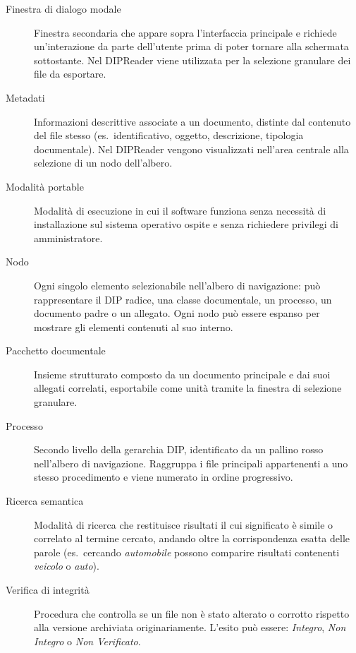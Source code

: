 \documentclass[a4paper,12pt]{article}
\begin{document}
\begin{description}
  \item[Finestra di dialogo modale]
    Finestra secondaria che appare sopra l'interfaccia principale e richiede
    un'interazione da parte dell'utente prima di poter tornare alla schermata
    sottostante. Nel DIPReader viene utilizzata per la selezione granulare dei
    file da esportare.

  \item[Metadati]
    Informazioni descrittive associate a un documento, distinte dal contenuto del
    file stesso (es.\ identificativo, oggetto, descrizione, tipologia documentale). Nel DIPReader vengono visualizzati nell'area centrale alla
    selezione di un nodo dell'albero.

  \item[Modalità portable]
    Modalità di esecuzione in cui il software funziona senza necessità di
    installazione sul sistema operativo ospite e senza richiedere privilegi
    di amministratore.

  \item[Nodo]
    Ogni singolo elemento selezionabile nell'albero di navigazione: può rappresentare
    il DIP radice, una classe documentale, un processo, un documento padre o un
    allegato. Ogni nodo può essere espanso per mostrare gli elementi contenuti
    al suo interno.

  \item[Pacchetto documentale]
    Insieme strutturato composto da un documento principale e dai suoi allegati
    correlati, esportabile come unità tramite la finestra di selezione granulare.

  \item[Processo]
    Secondo livello della gerarchia DIP, identificato da un pallino rosso
    nell'albero di navigazione. Raggruppa i file principali appartenenti a uno
    stesso procedimento e viene numerato in ordine progressivo.

  \item[Ricerca semantica]
    Modalità di ricerca che restituisce risultati il cui significato è simile o
    correlato al termine cercato, andando oltre la corrispondenza esatta delle
    parole (es.\ cercando \textit{automobile} possono comparire risultati contenenti
    \textit{veicolo} o \textit{auto}).

  \item[Verifica di integrità]
    Procedura che controlla se un file non è stato alterato o corrotto rispetto
    alla versione archiviata originariamente. L'esito può essere:
    \textit{Integro}, \textit{Non Integro} o \textit{Non Verificato}.

\end{description}
\end{document}
